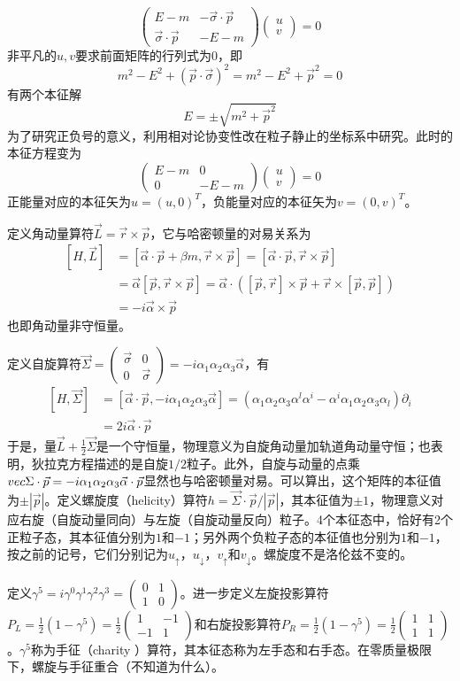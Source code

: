 \documentclass[a4paper,11pt]{ctexart}
\newcommand{\beq}{\begin{equation}}
\newcommand{\eeq}{\end{equation}}
\newcommand{\bea}{\begin{equation}\begin{aligned}}
\newcommand{\eea}{\end{aligned}\end{equation}}
\newcommand{\mt}[4]{\begin{pmatrix}#1 & #2 \\ #3 & #4 \end{pmatrix}}
\begin{document}
\beq
\begin{pmatrix}
E-m & -\vec{\sigma} \cdot \vec{p} \\
\vec{\sigma} \cdot \vec{p} & -E-m
\end{pmatrix}
\begin{pmatrix} u \\ v \end{pmatrix}
=0
\eeq
非平凡的$u,v$要求前面矩阵的行列式为0，即
\beq
m^2 - E^2 + \left( \vec{p} \cdot \vec{\sigma}\right)^2 = m^2 - E^2 + \vec{p}^2 = 0
\eeq
有两个本征解
\beq
E = \pm \sqrt{m^2 + \vec{p}^2}
\eeq
为了研究正负号的意义，利用相对论协变性改在粒子静止的坐标系中研究。此时的本征方程变为
\beq
\mt{E-m}{0}{0}{-E-m} \begin{pmatrix} u \\ v \end{pmatrix} = 0
\eeq
正能量对应的本征矢为$u = (u,0)^T$，负能量对应的本征矢为$v = (0,v)^T$。\par
定义角动量算符$\vec{L} = \vec{r} \times \vec{p}$，它与哈密顿量的对易关系为
\bea
[H,\vec{L}] &= [\vec{\alpha} \cdot \vec{p} + \beta m , \vec{r} \times \vec{p}] = [\vec{\alpha} \cdot \vec{p},\vec{r} \times \vec{p}] \\ &= \vec{\alpha} [\vec{p},\vec{r} \times \vec{p}] = \vec{\alpha} \cdot \left( [\vec{p} ,\vec{r}] \times \vec{p} + \vec{r} \times [\vec{p}, \vec{p}] \right) \\
&= -i \vec{\alpha} \times \vec{p}
\eea
也即角动量非守恒量。
\par
定义自旋算符$\vec{\Sigma} = \mt{\vec{\sigma}}{0}{0}{\vec{\sigma}} = -i \alpha_1 \alpha_2 \alpha_3 \vec{\alpha}$，有
\bea
[H,\vec{\Sigma}] &= [\vec{\alpha} \cdot \vec{p} , -i \alpha_1 \alpha_2 \alpha_3 \vec{\alpha}]  = \left( \alpha_1 \alpha_2 \alpha_3 \alpha^l \alpha^i - \alpha^i \alpha_1 \alpha_2 \alpha_3 \alpha_l \right) \partial_i \\
&=2i \vec{\alpha} \cdot \vec{p}
\eea
于是，量$\vec{L} + \frac{1}{2} \vec{\Sigma}$是一个守恒量，物理意义为自旋角动量加轨道角动量守恒；也表明，狄拉克方程描述的是自旋$1/2$粒子。此外，自旋与动量的点乘$\\vec{\Sigma} \cdot \vec{p} = -i \alpha_1 \alpha_2 \alpha_3 \vec{\alpha} \cdot \vec{p}$显然也与哈密顿量对易。可以算出，这个矩阵的本征值为$\pm |\vec{p}|$。定义螺旋度（helicity）算符$h = \vec{\Sigma}\cdot \vec{p} / | \vec{p} |$，其本征值为$\pm 1$，物理意义对应右旋（自旋动量同向）与左旋（自旋动量反向）粒子。4个本征态中，恰好有2个正粒子态，其本征值分别为$1$和$-1$；另外两个负粒子态的本征值也分别为$1$和$-1$，按之前的记号，它们分别记为$u_\uparrow$，$u_\downarrow$，$v_\uparrow$和$v_\downarrow$。螺旋度不是洛伦兹不变的。
\par
定义$\gamma^5 = i \gamma^0 \gamma^1 \gamma^2 \gamma^3 = \mt{0}{1}{1}{0}$。进一步定义左旋投影算符$P_L = \frac{1}{2} \left( 1 - \gamma^5 \right) = \frac{1}{2}\mt{1}{-1}{-1}{1}$和右旋投影算符$P_R = \frac{1}{2} \left( 1 - \gamma^5 \right) = \frac{1}{2} \mt{1}{1}{1}{1}$。$\gamma^5$称为手征（charity ）算符，其本征态称为左手态和右手态。在零质量极限下，螺旋与手征重合（不知道为什么）。
\end{document}
